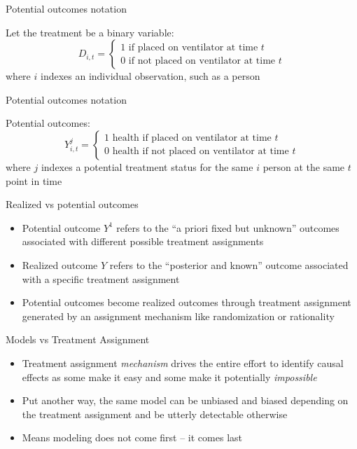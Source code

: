 \documentclass{beamer}
\begin{document}
\begin{frame}{Potential outcomes notation}

Let the treatment be a binary variable: $$D_{i,t} =\begin{cases} 1 \text{ if placed on ventilator at time $t$} \\ 0 \text{ if not placed on ventilator at time $t$} \end{cases}$$where $i$ indexes an individual observation, such as a person
\end{frame}

\begin{frame}{Potential outcomes notation}

Potential outcomes: $$Y_{i,t}^j =\begin{cases} 1 \text{ health if placed on ventilator at time $t$} \\ 0 \text{ health if not placed on ventilator at time $t$} \end{cases}$$where $j$ indexes a potential treatment status for the same $i$ person at the same $t$ point in time
\end{frame}


\begin{frame}{Realized vs potential outcomes}

  \begin{itemize}
    \item Potential outcome $Y^1$ refers to the ``a priori fixed but unknown'' outcomes associated with different possible treatment assignments
    \item Realized outcome $Y$ refers to the ``posterior and known'' outcome associated with a specific treatment assignment
    \item Potential outcomes become realized outcomes through treatment assignment generated by an assignment mechanism like randomization or rationality
  \end{itemize}
\end{frame}


\begin{frame}{Models vs Treatment Assignment}

\begin{itemize}
    \item Treatment assignment \emph{mechanism} drives the entire effort to identify causal effects as some make it easy and some make it potentially \emph{impossible}
	\item Put another way, the same model can be unbiased and biased depending on the treatment assignment and be utterly detectable otherwise
	\item Means modeling does not come first -- it comes last
	\end{itemize}
\end{frame}
\end{document}
